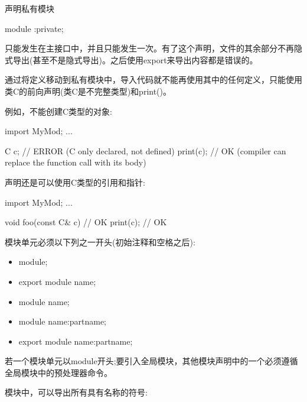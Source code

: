 声明私有模块

\begin{cpp}
module :private;
\end{cpp}

只能发生在主接口中，并且只能发生一次。有了这个声明，文件的其余部分不再隐式导出(甚至不是隐式导出)。之后使用export来导出内容都是错误的。

通过将定义移动到私有模块中，导入代码就不能再使用其中的任何定义，只能使用类C的前向声明(类C是不完整类型)和print()。

例如，不能创建C类型的对象:

\begin{cpp}
import MyMod;
...

C c; // ERROR (C only declared, not defined)
print(c); // OK (compiler can replace the function call with its body)
\end{cpp}

声明还是可以使用C类型的引用和指针:

\begin{cpp}
import MyMod;
...

void foo(const C& c) { // OK
	print(c); // OK
}
\end{cpp}


模块单元必须以下列之一开头(初始注释和空格之后):

\begin{itemize}
\item
module;

\item
export module name;

\item
module name;

\item
module name:partname;

\item
export module name:partname;
\end{itemize}

若一个模块单元以module开头;要引入全局模块，其他模块声明中的一个必须遵循全局模块中的预处理器命令。

模块中，可以导出所有具有名称的符号:

